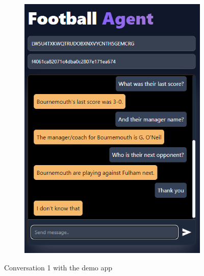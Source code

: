 \documentclass[10pt,a4paper,twocolumn]{article}
\begin{document}
\begin{figure}
\begin{subfigure}[b]{0.47\textwidth}
        \includegraphics[width=\textwidth]{assets/Screenshot_6.png}
    \end{subfigure}
    \caption*{Conversation 1 with the demo app}
\end{figure}
\end{document}

